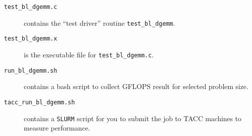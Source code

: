 \begin{description}
\begin{description}
\item[{\tt test\_bl\_dgemm.c}] contains the ``test driver'' routine {\tt test\_bl\_dgemm}. 
\item[{\tt test\_bl\_dgemm.x}] is the executable file for {\tt test\_bl\_dgemm.c}. 
\item[{\tt run\_bl\_dgemm.sh}] contains a bash script to collect GFLOPS result for selected problem size.
\item[{\tt tacc\_run\_bl\_dgemm.sh}] contains a {\tt SLURM} script for you to submit the job to TACC machines to measure performance.
\end{description}
\item[{\tt }]
\end{description}


